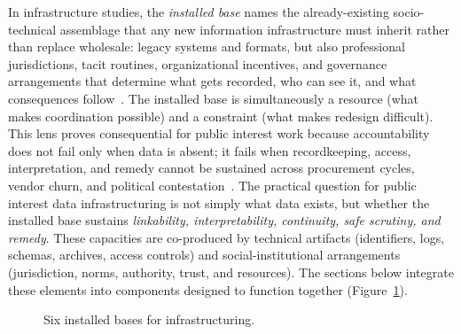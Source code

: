 \documentclass[acmsmall,screen]{acmart}
\begin{document}
In infrastructure studies, the \emph{installed base} names the already-existing socio-technical assemblage that any new information infrastructure must inherit rather than replace wholesale: legacy systems and formats, but also professional jurisdictions, tacit routines, organizational incentives, and governance arrangements that determine what gets recorded, who can see it, and what consequences follow~\cite{starStepsEcologyInfrastructure1994a,starEthnographyInfrastructure1999a,aanestadInformationInfrastructuresChallenge2017}. The installed base is simultaneously a resource (what makes coordination possible) and a constraint (what makes redesign difficult). This lens proves consequential for public interest work because accountability does not fail only when data is absent; it fails when recordkeeping, access, interpretation, and remedy cannot be sustained across procurement cycles, vendor churn, and political contestation~\cite{hansethDesignTheoryDynamic2010,karastiStudyingInfrastructuringEthnographically2018a}. The practical question for public interest data infrastructuring is not simply what data exists, but whether the installed base sustains \emph{linkability, interpretability, continuity, safe scrutiny, and remedy}. These capacities are co-produced by technical artifacts (identifiers, logs, schemas, archives, access controls) and social-institutional arrangements (jurisdiction, norms, authority, trust, and resources). The sections below integrate these elements into components designed to function together (Figure~\ref{fig:installed_bases}).

\begin{figure}
    \centering
    
    \caption{Six installed bases for infrastructuring.}
    \label{fig:installed_bases}
\end{figure}
\end{document}
